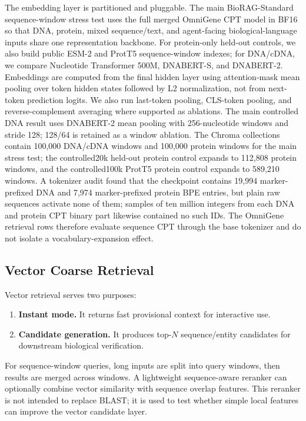 \documentclass[11pt]{article}
\begin{document}
The embedding layer is partitioned and pluggable. The main BioRAG-Standard sequence-window stress test uses the full merged OmniGene CPT model in BF16 so that DNA, protein, mixed sequence/text, and agent-facing biological-language inputs share one representation backbone. For protein-only held-out controls, we also build public ESM-2 and ProtT5 sequence-window indexes; for DNA/cDNA, we compare Nucleotide Transformer 500M, DNABERT-S, and DNABERT-2. Embeddings are computed from the final hidden layer using attention-mask mean pooling over token hidden states followed by L2 normalization, not from next-token prediction logits. We also run last-token pooling, CLS-token pooling, and reverse-complement averaging where supported as ablations. The main controlled DNA result uses DNABERT-2 mean pooling with 256-nucleotide windows and stride 128; 128/64 is retained as a window ablation. The Chroma collections contain 100,000 DNA/cDNA windows and 100,000 protein windows for the main stress test; the controlled20k held-out protein control expands to 112,808 protein windows, and the controlled100k ProtT5 protein control expands to 589,210 windows. A tokenizer audit found that the checkpoint contains 19,994 marker-prefixed DNA and 7,974 marker-prefixed protein BPE entries, but plain raw sequences activate none of them; samples of ten million integers from each DNA and protein CPT binary part likewise contained no such IDs. The OmniGene retrieval rows therefore evaluate sequence CPT through the base tokenizer and do not isolate a vocabulary-expansion effect.

\subsection{Vector Coarse Retrieval}

Vector retrieval serves two purposes:
\begin{enumerate}
  \item \textbf{Instant mode.} It returns fast provisional context for interactive use.
  \item \textbf{Candidate generation.} It produces top-$N$ sequence/entity candidates for downstream biological verification.
\end{enumerate}
For sequence-window queries, long inputs are split into query windows, then results are merged across windows. A lightweight sequence-aware reranker can optionally combine vector similarity with sequence overlap features. This reranker is not intended to replace BLAST; it is used to test whether simple local features can improve the vector candidate layer.
\end{document}
